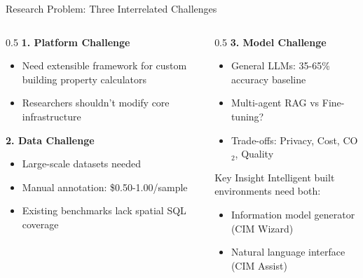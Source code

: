 \documentclass{beamer}
\begin{document}
\begin{frame}{Research Problem: Three Interrelated Challenges}
\begin{columns}
\begin{column}{0.5\textwidth}
\textbf{1. Platform Challenge}
\begin{itemize}
    \item Need extensible framework for custom building property calculators
    \item Researchers shouldn't modify core infrastructure
\end{itemize}

\vspace{0.3cm}
\textbf{2. Data Challenge}
\begin{itemize}
    \item Large-scale datasets needed
    \item Manual annotation: \$0.50-1.00/sample
    \item Existing benchmarks lack spatial SQL coverage
\end{itemize}
\end{column}
\begin{column}{0.5\textwidth}
\textbf{3. Model Challenge}
\begin{itemize}
    \item General LLMs: 35-65\% accuracy baseline
    \item Multi-agent RAG vs Fine-tuning?
    \item Trade-offs: Privacy, Cost, CO$_2$, Quality
\end{itemize}

\vspace{0.3cm}
\begin{block}{Key Insight}
Intelligent built environments need both:
\begin{itemize}
    \item Information model generator (CIM Wizard)
    \item Natural language interface (CIM Assist)
\end{itemize}
\end{block}
\end{column}
\end{columns}
\end{frame}
\end{document}
